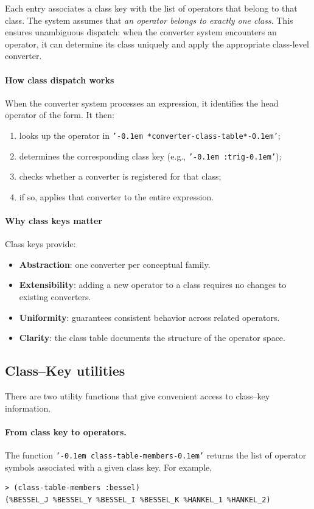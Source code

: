 \documentclass[12pt,fleqn]{extarticle}
\newcommand{\ttq}[1]{\texttt{'\kern-0.1em #1\kern-0.1em'}}
\newenvironment{maximabox}
  {\begin{tcolorbox}[
      breakable,
      enhanced,
      colback=white,
      colframe=black!8,
      boxrule=0pt,
      borderline west={2.2pt}{0pt}{black!25},
      arc=1pt,
      left=11pt,
      right=7pt,
      top=9pt,
      bottom=9pt,
      before skip=14pt,
      after skip=14pt
    ]}
  {\end{tcolorbox}}
\begin{document}
Each entry associates a class key with the list of operators that belong to
that class. The system assumes that \emph{an operator belongs to exactly one class}.
This ensures unambiguous dispatch: when the converter system encounters an
operator, it can determine its class uniquely and apply the appropriate
class-level converter.

\paragraph{How class dispatch works} When the converter system processes an expression, it identifies the head operator of the form. It then:
\begin{enumerate}[label=(\alph*), noitemsep, topsep=0pt]
  \item looks up the operator in \ttq{*converter-class-table*};
  \item determines the corresponding class key (e.g., \ttq{:trig});
  \item checks whether a converter is registered for that class;
  \item if so, applies that converter to the entire expression.
\end{enumerate}

\paragraph{Why class keys matter} Class keys provide:
\begin{itemize}
  \item \textbf{Abstraction}: one converter per conceptual family.
  \item \textbf{Extensibility}: adding a new operator to a class requires no
        changes to existing converters.
  \item \textbf{Uniformity}: guarantees consistent behavior across related
        operators.
  \item \textbf{Clarity}: the class table documents the structure of the
        operator space.
\end{itemize}

\subsection{Class--Key utilities}
\label{subsec:class-key-utilities}

There are two  utility functions that give convenient access to 
class--key information. 

\paragraph{From class key to operators.}
The function \ttq{class-table-members} returns the list of operator symbols
associated with a given class key.  For example,
\begin{maximabox}
\begin{verbatim}
> (class-table-members :bessel)
(%BESSEL_J %BESSEL_Y %BESSEL_I %BESSEL_K %HANKEL_1 %HANKEL_2)
\end{verbatim}
\end{maximabox}
\end{document}
